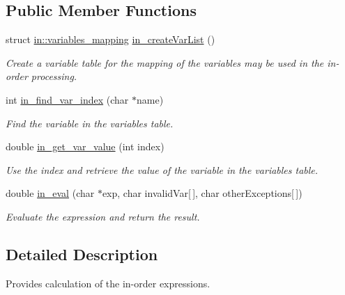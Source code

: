 \subsection*{Public Member Functions}
\begin{DoxyCompactItemize}
\item 
\hypertarget{structin_a3c7d1247103c2f7c856f2b302761e358}{struct \hyperlink{structin_1_1variables__mapping}{in\-::variables\-\_\-mapping} \hyperlink{structin_a3c7d1247103c2f7c856f2b302761e358}{in\-\_\-create\-Var\-List} ()}\label{structin_a3c7d1247103c2f7c856f2b302761e358}

\begin{DoxyCompactList}\small\item\em Create a variable table for the mapping of the variables may be used in the in-\/order processing. \end{DoxyCompactList}\item 
int \hyperlink{structin_a2611e45a71ad35f7d48a1af1bfd2aa6f}{in\-\_\-find\-\_\-var\-\_\-index} (char $\ast$name)
\begin{DoxyCompactList}\small\item\em Find the variable in the variables table. \end{DoxyCompactList}\item 
double \hyperlink{structin_a58a044aea41ec49969df9ebb88c1306b}{in\-\_\-get\-\_\-var\-\_\-value} (int index)
\begin{DoxyCompactList}\small\item\em Use the index and retrieve the value of the variable in the variables table. \end{DoxyCompactList}\item 
double \hyperlink{structin_a9f89619ddc7bb71bce7e5903f095eb61}{in\-\_\-eval} (char $\ast$exp, char invalid\-Var\mbox{[}$\,$\mbox{]}, char other\-Exceptions\mbox{[}$\,$\mbox{]})
\begin{DoxyCompactList}\small\item\em Evaluate the expression and return the result. \end{DoxyCompactList}\end{DoxyCompactItemize}


\subsection{Detailed Description}
Provides calculation of the in-\/order expressions. 

